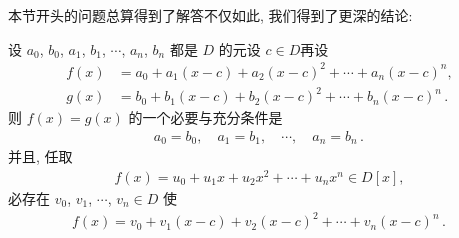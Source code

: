 本节开头的问题总算得到了解答\period 不仅如此, 我们得到了更深的结论:

\begin{proposition}
    设 $a_0$, $b_0$, $a_1$, $b_1$, $\cdots$, $a_n$, $b_n$ 都是 $D$ 的元\period 设 $c \in D$\period 再设
    \begin{align*}
        f(x) & = a_0 + a_1 (x - c) + a_2 (x - c)^2 + \cdots + a_n (x - c)^n,        \\
        g(x) & = b_0 + b_1 (x - c) + b_2 (x - c)^2 + \cdots + b_n (x - c)^n \period
    \end{align*}
    则 $f(x)=g(x)$ 的一个必要与充分条件是
    \begin{align*}
        a_0 = b_0, \quad a_1 = b_1, \quad \cdots, \quad a_n = b_n \period
    \end{align*}
    并且, 任取
    \begin{align*}
        f(x) = u_0 + u_1 x + u_2 x^2 + \cdots + u_n x^n \in D[x],
    \end{align*}
    必存在 $v_0$, $v_1$, $\cdots$, $v_n \in D$ 使
    \begin{align*}
        f(x) = v_0 + v_1 (x - c) + v_2 (x - c)^2 + \cdots + v_n (x - c)^n \period
    \end{align*}
\end{proposition}
